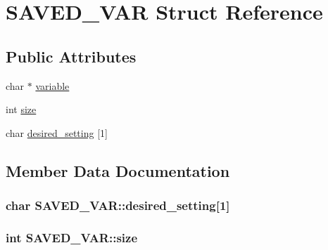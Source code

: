 \hypertarget{structSAVED__VAR}{}\section{S\+A\+V\+E\+D\+\_\+\+V\+AR Struct Reference}
\label{structSAVED__VAR}
\subsection*{Public Attributes}
\begin{DoxyCompactItemize}
\item 
char $\ast$ \hyperlink{structSAVED__VAR_aaa9de1da489d7268a1c427e99535cc89}{variable}
\item 
int \hyperlink{structSAVED__VAR_a1e2b708a760c32e1c6826b83b3d7e799}{size}
\item 
char \hyperlink{structSAVED__VAR_abce2c6eb701e549ef4e2c3f90d64a780}{desired\+\_\+setting} \mbox{[}1\mbox{]}
\end{DoxyCompactItemize}


\subsection{Member Data Documentation}
\subsubsection[{\texorpdfstring{desired\+\_\+setting}{desired_setting}}]{\setlength{\rightskip}{0pt plus 5cm}char S\+A\+V\+E\+D\+\_\+\+V\+A\+R\+::desired\+\_\+setting\mbox{[}1\mbox{]}}\hypertarget{structSAVED__VAR_abce2c6eb701e549ef4e2c3f90d64a780}{}\label{structSAVED__VAR_abce2c6eb701e549ef4e2c3f90d64a780}
\subsubsection[{\texorpdfstring{size}{size}}]{\setlength{\rightskip}{0pt plus 5cm}int S\+A\+V\+E\+D\+\_\+\+V\+A\+R\+::size}\hypertarget{structSAVED__VAR_a1e2b708a760c32e1c6826b83b3d7e799}{}\label{structSAVED__VAR_a1e2b708a760c32e1c6826b83b3d7e799}

